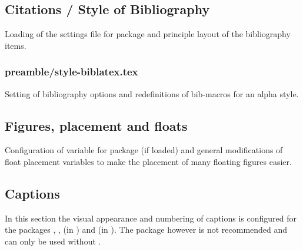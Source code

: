 \subsection{Citations / Style of Bibliography}

Loading of the settings file  for package  and principle layout of the bibliography items.


\subsubsection{preamble/style-biblatex.tex}

Setting of bibliography options and redefinitions of bib-macros for an alpha style.


\subsection{Figures, placement and floats}

Configuration of variable for package  (if loaded) and 
general modifications of float placement variables to make the placement of 
many floating figures easier.


\subsection{Captions}

In this section the visual appearance and numbering of captions is configured 
for the packages , , 
 (in ) and  (in ). 
The package  however is not 
recommended and can only be used without .


